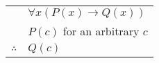 \documentclass{standalone}
\begin{document}
\begin{tabular}{rl}
    & $\forall x \left(P\left(x\right) \to Q\left(x\right)\right)$ \\
    & $P\left(c\right)$ for an arbitrary $c$ \\
    \hline
    $\therefore$ & $Q\left(c\right)$ 
\end{tabular}
\end{document}
